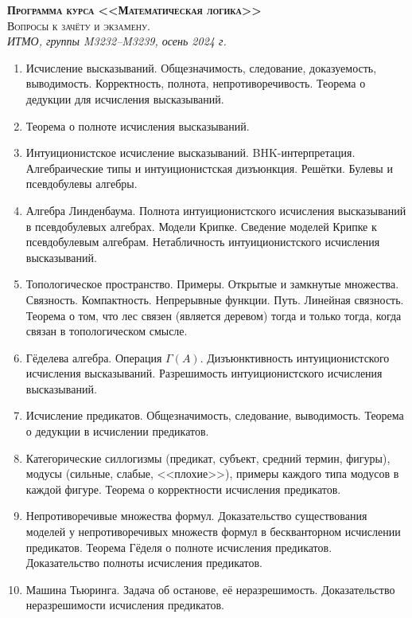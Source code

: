 \documentclass[11pt,a4paper,oneside]{scrartcl}
\begin{document}
\pagestyle{empty}

\begin{center}
{\large\scshape\bfseries Программа курса <<Математическая логика>>}\\
{\large\scshape Вопросы к зачёту и экзамену.}\\
\itshape ИТМО, группы M3232--M3239, осень 2024 г.
\end{center}


\begin{enumerate}
\item Исчисление высказываний. Общезначимость, следование, доказуемость, выводимость. Корректность, полнота, непротиворечивость.
Теорема о дедукции для исчисления высказываний. 
\item Теорема о полноте исчисления высказываний.
\item Интуиционистское исчисление высказываний. BHK-интерпретация. Алгебраические типы и интуиционистская дизъюнкция.
Решётки. Булевы и псевдобулевы алгебры.
\item Алгебра Линденбаума. Полнота интуиционистского исчисления высказываний в псевдобулевых алгебрах.
Модели Крипке. Сведение моделей Крипке к псевдобулевым алгебрам. Нетабличность 
интуиционистского исчисления высказываний.
\item Топологическое пространство. Примеры. Открытые и замкнутые множества. Связность. Компактность. Непрерывные функции. Путь.
Линейная связность. Теорема о том, что лес связен (является деревом) тогда и только тогда, когда связан в топологическом смысле.
\item Гёделева алгебра. Операция $\Gamma(A)$. Дизъюнктивность интуиционистского исчисления высказываний. Разрешимость 
интуиционистского исчисления высказываний.
\item Исчисление предикатов. Общезначимость, следование, выводимость. Теорема о дедукции в исчислении предикатов.
\item Категорические силлогизмы (предикат, субъект, средний термин, фигуры), модусы (сильные, слабые, <<плохие>>), примеры каждого
типа модусов в каждой фигуре. Теорема о корректности исчисления предикатов.
\item Непротиворечивые множества формул. Доказательство существования моделей у непротиворечивых множеств формул 
в бескванторном исчислении предикатов.
Теорема Гёделя о полноте исчисления предикатов. Доказательство полноты исчисления предикатов.
\item Машина Тьюринга. Задача об останове, её неразрешимость. Доказательство неразрешимости исчисления предикатов.

\end{enumerate}
\end{document}
